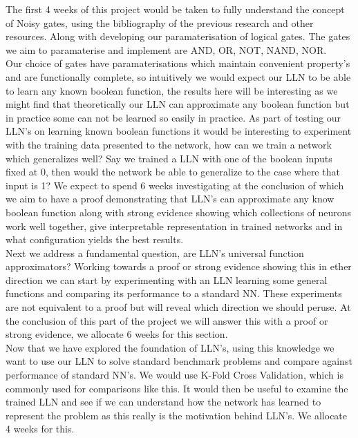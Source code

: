 \documentclass[11pt, a4paper, twoside, openright]{report}
\begin{document}
The first 4 weeks of this project would be taken to fully understand the concept of Noisy gates, using the bibliography of the previous research and other resources. Along with developing our paramaterisation of logical gates. The gates we aim to paramaterise and implement are AND, OR, NOT, NAND, NOR. \\

Our choice of gates have paramaterisations which maintain convenient property's and are functionally complete, so intuitively we would expect our LLN to be able to learn any known boolean function, the results here will be interesting as we might find that theoretically our LLN can approximate any boolean function but in practice some can not be learned so easily in practice. As part of testing our LLN's on learning known boolean functions it would be interesting to experiment with the training data presented to the network, how can we train a network which generalizes well? Say we trained a LLN with one of the boolean inputs fixed at 0, then would the network be able to generalize to the case where that input is 1? We expect to spend 6 weeks investigating at the conclusion of which we aim to have a proof demonstrating that LLN's can approximate any know boolean function along with strong evidence showing which collections of neurons work well together, give interpretable representation in trained networks and in what configuration yields the best results. \\

Next we address a fundamental question, are LLN's universal function approximators? Working towards a proof or strong evidence showing this in ether direction we can start by experimenting with an LLN learning some general functions and comparing its performance to a standard NN. These experiments are not equivalent to a proof but will reveal which direction we should peruse. At the conclusion of this part of the project we will answer this with a proof or strong evidence, we allocate 6 weeks for this section. \\

Now that we have explored the foundation of LLN's, using this knowledge we want to use our LLN to solve standard benchmark problems and compare against performance of standard NN's. We would use K-Fold Cross Validation, which is commonly used for comparisons like this. It would then be useful to examine the trained LLN and see if we can understand how the network has learned to represent the problem as this really is the motivation behind LLN's. We allocate 4 weeks for this. \\
\end{document}
